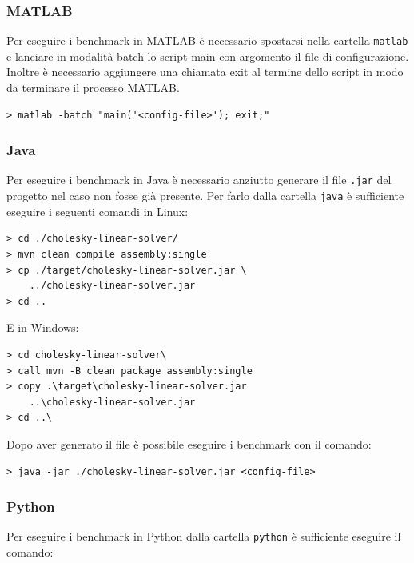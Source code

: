 \documentclass[a4paper, 12pt]{article}
\begin{document}
            \subsubsection{MATLAB}
                Per eseguire i benchmark in MATLAB è necessario spostarsi nella
                cartella \texttt{matlab} e lanciare in modalità batch lo script
                main con argomento il file di configurazione. Inoltre è
                necessario aggiungere una chiamata exit al termine dello script
                in modo da terminare il processo MATLAB.

\begin{lstlisting}[frame=single]
> matlab -batch "main('<config-file>'); exit;"
\end{lstlisting}

            \subsubsection{Java}
            Per eseguire i benchmark in Java è necessario anziutto generare il
            file \texttt{.jar} del progetto nel caso non fosse già presente.
            Per farlo dalla cartella \texttt{java} è sufficiente eseguire i
            seguenti comandi in Linux:

\begin{lstlisting}[frame=single]
> cd ./cholesky-linear-solver/
> mvn clean compile assembly:single
> cp ./target/cholesky-linear-solver.jar \
    ../cholesky-linear-solver.jar
> cd ..
\end{lstlisting}

            E in Windows:

\begin{lstlisting}[frame=single]
> cd cholesky-linear-solver\
> call mvn -B clean package assembly:single
> copy .\target\cholesky-linear-solver.jar 
    ..\cholesky-linear-solver.jar
> cd ..\
\end{lstlisting}

            Dopo aver generato il file è possibile eseguire i benchmark con il
            comando:

\begin{lstlisting}[frame=single]
> java -jar ./cholesky-linear-solver.jar <config-file>
\end{lstlisting} 

        \subsubsection{Python}
            Per eseguire i benchmark in Python dalla cartella \texttt{python} è
            sufficiente eseguire il comando:
\end{document}
